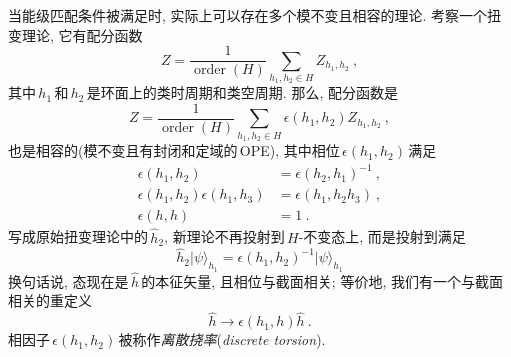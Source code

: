当能级匹配条件被满足时, 实际上可以存在多个模不变且相容的理论. 考察一个扭变理论, 它有配分函数
\begin{equation}
    Z=\frac{1}{\operatorname{order}(H)}\sum_{h_{1},h_{2}\in H}Z_{h_{1},h_{2}} \:, \label{11.3.7}
\end{equation}
其中$\,h_{1}\,$和$\,h_{2}\,$是环面上的类时周期和类空周期. 那么, 配分函数是
\begin{equation}
    Z=\frac{1}{\operatorname{order}(H)}\sum_{h_{1},h_{2}\in H}\epsilon(h_{1},h_{2}) Z_{h_{1},h_{2}} \:, \label{11.3.8}
\end{equation}
也是相容的(模不变且有封闭和定域的\,OPE), 其中相位$\,\epsilon(h_{1},h_{2})\,$满足
\begin{subequations}
\begin{align}
    \epsilon(h_{1},h_{2}) &= \epsilon(h_{2},h_{1})^{-1} \:, \label{11.3.9a} \\
    \epsilon(h_{1},h_{2})\epsilon(h_{1},h_{3}) &= \epsilon(h_{1},h_{2}h_{3}) \:,\label{11.3.9b} \\
    \epsilon(h,h) &= 1 \:. \label{11.3.9c}
\end{align} \label{11.3.9}
\end{subequations}
写成原始扭变理论中的$\,\hat{h}_{2}$, 新理论不再投射到\,$H$-不变态上, 而是投射到满足
\begin{equation}
\hat{h}_{2}\lvert\psi\rangle_{h_{1}} = \epsilon(h_{1},h_{2})^{-1}\lvert \psi\rangle_{h_{1}} \label{11.3.10}    
\end{equation}
换句话说, 态现在是$\,\hat{h}\,$的本征矢量, 且相位与截面相关; 等价地, 我们有一个与截面相关的重定义
\begin{equation}
    \hat{h}\to \epsilon(h_{1},h)\hat{h} \:. \label{11.3.11}
\end{equation}
相因子$\,\epsilon(h_{1},h_{2})\,$被称作{\emph{离散挠率}}(\emph{discrete torsion}).

